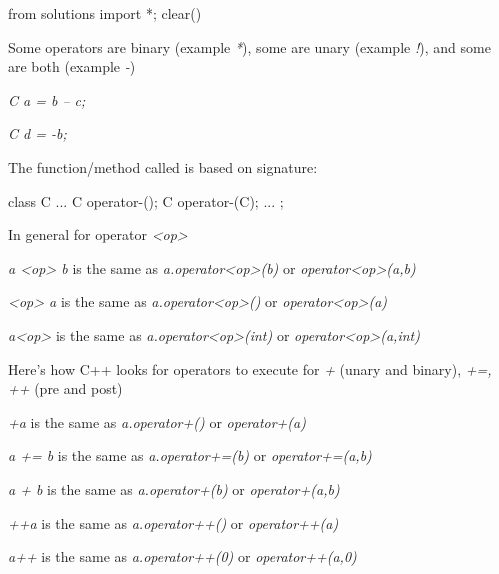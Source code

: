 \begin{python0}
from solutions import *; clear()
\end{python0}

Some operators are binary (example \textit{*}), some are unary (example
\textit{!}), and some are both (example \textit{-})

\textit{C a = b -- c;}

\textit{C d = -b;}

The function/method called is based on signature:

\begin{consolethree}[escapeinside=||]
class C
{
    ...
    C operator-();
    C operator-(C);
    ...
};
\end{consolethree}

In general for operator \textit{<op>}

\textit{a <op> b} is the same as \textit{a.operator<op>(b)} or \textit{operator<op>(a,b)}

\textit{<op> a} is the same as \textit{a.operator<op>()} or \textit{operator<op>(a)}

\textit{a<op>} is the same as \textit{a.operator<op>(int)} or \textit{operator<op>(a,int)}

Here's how C++ looks for operators to execute for
\textit{+} (unary and binary), \textit{+=, ++} (pre and post)

\textit{+a} is the same as \textit{a.operator+()} or \textit{operator+(a)}

\textit{a += b} is the same as \textit{a.operator+=(b)} or \textit{operator+=(a,b)}

\textit{a + b} is the same as \textit{a.operator+(b)} or \textit{operator+(a,b)}

\textit{++a} is the same as \textit{a.operator++()} or \textit{operator++(a)}

\textit{a++} is the same as \textit{a.operator++(0)} or \textit{operator++(a,0)}


